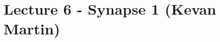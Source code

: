 \documentclass[english,11pt]{article}
\begin{document}









\section{Lecture 6 - Synapse 1 (Kevan Martin)}
\end{document}

